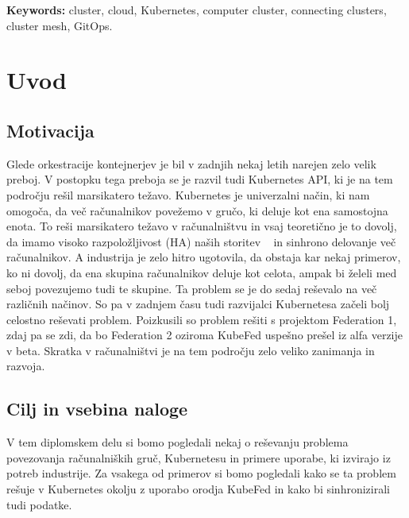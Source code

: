 \documentclass[a4paper, 12pt]{book}
\newcommand{\tkeywordsEn}{cluster, cloud, Kubernetes, computer cluster, connecting clusters, cluster mesh, GitOps}
\newcommand{\clearemptydoublepage}{\newpage{\pagestyle{empty}\cleardoublepage}}
\begin{document}
\bigskip
\noindent\textbf{Keywords:} \tkeywordsEn.
\clearemptydoublepage
\mainmatter
\setcounter{page}{1}
\pagestyle{fancy}
\chapter{Uvod}
\label{uvod}
\section{Motivacija}
Glede orkestracije kontejnerjev je bil v zadnjih nekaj letih narejen zelo velik preboj. 
V postopku tega preboja se je razvil tudi Kubernetes API, ki je na tem področju rešil marsikatero težavo.
Kubernetes  je univerzalni način, ki nam omogoča, da več računalnikov povežemo v gručo, ki deluje kot ena samostojna enota. 
To reši marsikatero težavo v računalništvu in vsaj teoretično je to dovolj, da imamo visoko razpoložljivost (HA) naših storitev ~\cite{mastering-Kubernetes} in sinhrono delovanje več računalnikov.
A industrija je zelo hitro ugotovila, da obstaja kar nekaj primerov, ko ni dovolj, da ena skupina računalnikov deluje kot celota, ampak bi želeli med seboj povezujemo tudi te skupine.
Ta problem se je do sedaj reševalo na več različnih načinov.
So pa v zadnjem času tudi razvijalci Kubernetesa začeli bolj celostno reševati problem.
Poizkusili so problem rešiti s projektom Federation 1, zdaj pa se zdi, da bo Federation 2 oziroma KubeFed uspešno prešel iz alfa verzije v beta.
Skratka v računalništvi je na tem področju zelo veliko zanimanja in razvoja.
\section{Cilj in vsebina naloge}
V tem diplomskem delu si bomo pogledali nekaj o reševanju problema povezovanja računalniških gruč, Kubernetesu in primere uporabe, ki izvirajo iz potreb industrije. 
Za vsakega od primerov si bomo pogledali kako se ta problem rešuje v Kubernetes okolju z uporabo orodja KubeFed in kako bi sinhronizirali tudi podatke.
\end{document}
